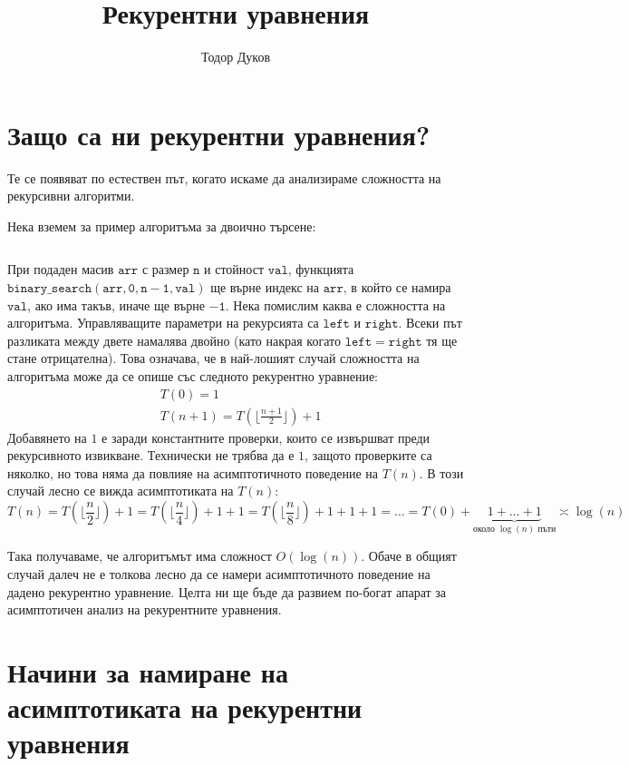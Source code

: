 \documentclass{article}
\title{Рекурентни уравнения}
\author{Тодор Дуков}
\date{}
\theoremstyle{definition}
\theoremstyle{plain}
\theoremstyle{remark}
\theoremstyle{definition}
\begin{document}
\maketitle

\section*{Защо са ни рекурентни уравнения?}

Те се появяват по естествен път, когато искаме да анализираме сложността на рекурсивни алгоритми.

Нека вземем за пример алгоритъма за двоично търсене:
\inputminted[linenos]{c++}{algorithms/binary_search.cpp}

При подаден масив $\mathtt{arr}$ с размер $\mathtt{n}$ и стойност $\mathtt{val}$, функцията $\mathtt{binary\_search(arr, 0, n - 1, val)}$ ще върне индекс на $\mathtt{arr}$, в който се намира $\mathtt{val}$, ако има такъв, иначе ще върне $\mathtt{-1}$.
Нека помислим каква е сложността на алгоритъма.
Управляващите параметри на рекурсията са $\mathtt{left}$ и $\mathtt{right}$.
Всеки път разликата между двете намалява двойно (като накрая когато $\mathtt{left = right}$ тя ще стане отрицателна).
Това означава, че в най-лошият случай сложността на алгоритъма може да се опише със следното рекурентно уравнение:
\begin{align*}
     & T(0) = 1                                          \\
     & T(n + 1) = T(\lfloor \frac{n + 1}{2} \rfloor) + 1
\end{align*}
Добавянето на $1$ е заради константните проверки, които се извършват преди рекурсивното извикване.
Технически не трябва да е $1$, защото проверките са няколко, но това няма да повлияе на асимптотичното поведение на $T(n)$.
В този случай лесно се вижда асимптотиката на $T(n)$:
\[
    T(n) = T(\lfloor \frac{n}{2} \rfloor) + 1 = T(\lfloor \frac{n}{4} \rfloor) + 1 + 1 = T(\lfloor \frac{n}{8} \rfloor) + 1 + 1 + 1 = \dots = T(0) + \underbrace{1 + \dots + 1}_{\text{около } \log(n) \text{ пъти}} \asymp \log(n)
\]

Така получаваме, че алгоритъмът има сложност $O(\log(n))$.
Обаче в общият случай далеч не е толкова лесно да се намери асимптотичното поведение на дадено рекурентно уравнение.
Целта ни ще бъде да развием по-богат апарат за асимптотичен анализ на рекурентните уравнения.

\section*{Начини за намиране на асимптотиката на рекурентни уравнения}
\end{document}
